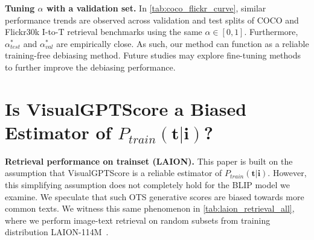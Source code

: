\documentclass{article} \usepackage{iclr2024_conference,times}
\begin{document}
{\bf Tuning $\alpha$ with a validation set.} In \autoref{tab:coco_flickr_curve}, similar performance trends are observed across validation and test splits of COCO and Flickr30k I-to-T retrieval benchmarks using the same $\alpha \in [0, 1]$. Furthermore, $\alpha_{test}^{\ast}$ and $\alpha_{val}^{\ast}$ are empirically close. As such, our method can function as a reliable training-free debiasing method. Future studies may explore fine-tuning methods to further improve the debiasing performance.



\begin{table}[h]
    \centering
    \caption{\small {\bf $\alpha$-debiasing results on both val set and test set for COCO/Flickr30k I-to-T retrieval.} We observe that validation and test performance are strongly correlated while we interpolate $\alpha \in [0, 1]$.}
    \label{tab:coco_flickr_curve}
\end{table}





\section{Is VisualGPTScore a Biased Estimator of $P_{train}(\mathbf{t}|\mathbf{i})$?}
\label{app:biased}
{\bf Retrieval performance on trainset (LAION).} This paper is built on the assumption that VisualGPTScore is a reliable estimator of $P_{train}(\mathbf{t}|\mathbf{i})$. However, this simplifying assumption does not completely hold for the BLIP model we examine. We speculate that such OTS generative scores are biased towards more common texts. We witness this same phenomenon in \autoref{tab:laion_retrieval_all}, where we perform image-text retrieval on random subsets from training distribution LAION-114M~\citep{blip}.
\end{document}

